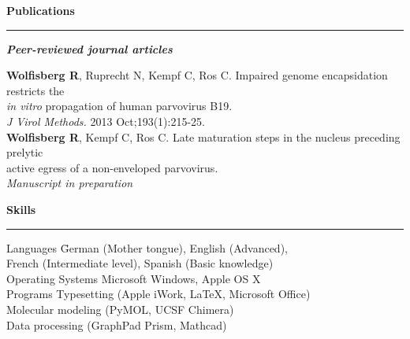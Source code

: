 \clearpage

\large
\textbf{Publications}
\noindent\rule[3mm]{\linewidth}{1pt}

\normalsize


\vspace{-0.25cm}
\textbf{\emph{Peer-reviewed journal articles}} \\[0.3 cm]

\begin{addmargin}{0.025\textwidth}
\textbf{Wolfisberg R}, Ruprecht N, Kempf C, Ros C. Impaired genome encapsidation
restricts the \\
\textit{in vitro} propagation of human parvovirus B19. \\
\textit{J Virol Methods.} 2013 Oct;193(1):215-25. \\[0.3 cm]

\textbf{Wolfisberg R}, Kempf C, Ros C. Late maturation steps in the nucleus preceding prelytic\\
 active egress of a non-enveloped parvovirus.\\ 
 \textit{Manuscript in preparation}
\end{addmargin}


\vspace{0.275 cm}
\large
\textbf{Skills}
\noindent\rule[3mm]{\linewidth}{1pt}

\normalsize
\vspace{-0.5 cm}
\begin{tabbing}
Languages \hspace{2.879 cm} \= German (Mother tongue), English (Advanced), \\
\> French (Intermediate level), Spanish (Basic knowledge) \\ [0.15 cm]
Operating Systems \> Microsoft Windows, Apple OS X \\ [0.15cm]
Programs \> Typesetting (Apple iWork, \LaTeX, Microsoft Office) \\
\> Molecular modeling (PyMOL, UCSF Chimera)\\
\> Data processing (GraphPad Prism, Mathcad)
\end{tabbing}






\vspace{0.275 cm}

